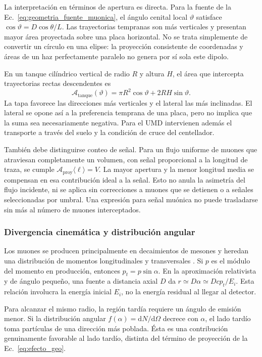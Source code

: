 La interpretación en términos de apertura es directa. Para la fuente de la Ec.~\ref{eq:geometria_fuente_muonica}, el ángulo cenital local $\vartheta$ satisface $\cos\vartheta=D\cos\theta/L$. Las trayectorias tempranas son más verticales y presentan mayor área proyectada sobre una placa horizontal. No se trata simplemente de convertir un círculo en una elipse: la proyección consistente de coordenadas y áreas de un haz perfectamente paralelo no genera por sí sola este dipolo.

En un tanque cilíndrico vertical de radio $R$ y altura $H$, el área que intercepta trayectorias rectas descendentes es
\begin{equation}
\mathcal A_{\mathrm{tanque}}(\vartheta)
=\pi R^2\cos\vartheta+2RH\sin\vartheta.
\label{eq:apertura_tanque}
\end{equation}
La tapa favorece las direcciones más verticales y el lateral las más inclinadas. El lateral se opone así a la preferencia temprana de una placa, pero no implica que la suma sea necesariamente negativa. Para el UMD intervienen además el transporte a través del suelo y la condición de cruce del centellador.

También debe distinguirse conteo de señal. Para un flujo uniforme de muones que atraviesan completamente un volumen, con señal proporcional a la longitud de traza, se cumple $\mathcal A_{\mathrm{proy}}\langle\ell\rangle=V$. La mayor apertura y la menor longitud media se compensan en esa contribución ideal a la señal. Esto no anula la asimetría del flujo incidente, ni se aplica sin correcciones a muones que se detienen o a señales seleccionadas por umbral. Una expresión para señal muónica no puede trasladarse sin más al número de muones interceptados.

\subsubsection{Divergencia cinemática y distribución angular}
\label{subsubsec:divergencia_cinematica}

Los muones se producen principalmente en decaimientos de mesones y heredan una distribución de momentos longitudinales y transversales \cite{Cazon2012}. Si $p$ es el módulo del momento en producción, entonces $p_t=p\sin\alpha$. En la aproximación relativista y de ángulo pequeño, una fuente a distancia axial $D$ da $r\simeq D\alpha\simeq Dcp_t/E_i$. Esta relación involucra la energía inicial $E_i$, no la energía residual al llegar al detector.

Para alcanzar el mismo radio, la región tardía requiere un ángulo de emisión menor. Si la distribución angular $f(\alpha)=\mathrm{d}N/\mathrm{d}\Omega$ decrece con $\alpha$, el lado tardío toma partículas de una dirección más poblada. Ésta es una contribución genuinamente favorable al lado tardío, distinta del término de proyección de la Ec.~\ref{eq:efecto_geo}.

